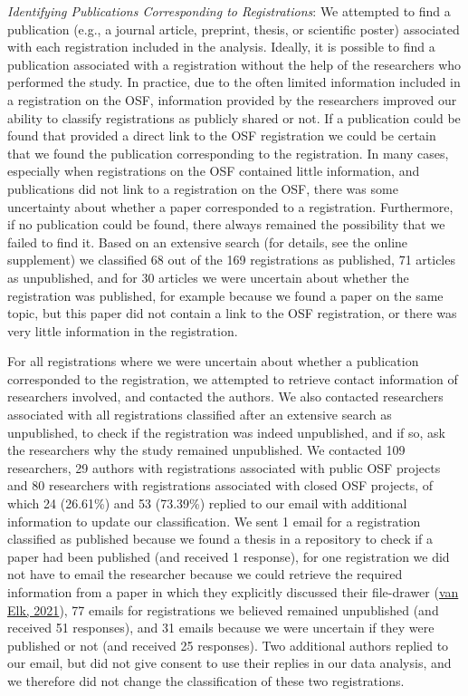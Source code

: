\documentclass[
  ,jou, a4paper,floatsintext]{apa6}
\begin{document}
\emph{Identifying Publications Corresponding to Registrations}: We attempted to find a publication (e.g., a journal article, preprint, thesis, or scientific poster) associated with each registration included in the analysis. Ideally, it is possible to find a publication associated with a registration without the help of the researchers who performed the study. In practice, due to the often limited information included in a registration on the OSF, information provided by the researchers improved our ability to classify registrations as publicly shared or not. If a publication could be found that provided a direct link to the OSF registration we could be certain that we found the publication corresponding to the registration. In many cases, especially when registrations on the OSF contained little information, and publications did not link to a registration on the OSF, there was some uncertainty about whether a paper corresponded to a registration. Furthermore, if no publication could be found, there always remained the possibility that we failed to find it. Based on an extensive search (for details, see the online supplement) we classified 68 out of the 169 registrations as published, 71 articles as unpublished, and for 30 articles we were uncertain about whether the registration was published, for example because we found a paper on the same topic, but this paper did not contain a link to the OSF registration, or there was very little information in the registration.

For all registrations where we were uncertain about whether a publication corresponded to the registration, we attempted to retrieve contact information of researchers involved, and contacted the authors. We also contacted researchers associated with all registrations classified after an extensive search as unpublished, to check if the registration was indeed unpublished, and if so, ask the researchers why the study remained unpublished. We contacted 109 researchers, 29 authors with registrations associated with public OSF projects and 80 researchers with registrations associated with closed OSF projects, of which 24 (26.61\%) and 53 (73.39\%) replied to our email with additional information to update our classification. We sent 1 email for a registration classified as published because we found a thesis in a repository to check if a paper had been published (and received 1 response), for one registration we did not have to email the researcher because we could retrieve the required information from a paper in which they explicitly discussed their file-drawer (\protect\hyperlink{ref-van_elk_whats_2021}{van Elk, 2021}), 77 emails for registrations we believed remained unpublished (and received 51 responses), and 31 emails because we were uncertain if they were published or not (and received 25 responses). Two additional authors replied to our email, but did not give consent to use their replies in our data analysis, and we therefore did not change the classification of these two registrations.
\end{document}
